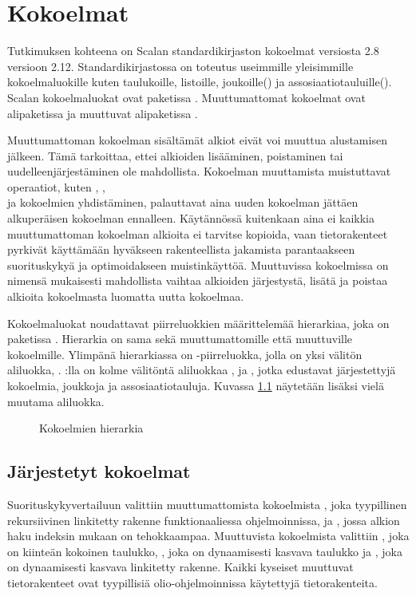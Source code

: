 \chapter{Kokoelmat} \label{Kokoelmat}
Tutkimuksen kohteena on Scalan standardikirjaston kokoelmat versiosta 2.8 versioon 2.12. Standardikirjastossa on toteutus useimmille yleisimmille kokoelmaluokille kuten taulukoille, listoille, joukoille() ja assosiaatiotauluille(). Scalan kokoelmaluokat ovat paketissa . Muuttumattomat kokoelmat ovat alipaketissa  ja muuttuvat alipaketissa .
\cite{scalaCollections}

Muuttumattoman kokoelman sisältämät alkiot eivät voi muuttua alustamisen jälkeen. Tämä tarkoittaa, ettei alkioiden lisääminen, poistaminen tai uudelleenjärjestäminen ole mahdollista. Kokoelman muuttamista muistuttavat operaatiot, kuten , , \\ ja kokoelmien yhdistäminen, palauttavat aina uuden kokoelman jättäen alkuperäisen kokoelman ennalleen. Käytännössä kuitenkaan aina ei kaikkia muuttumattoman kokoelman alkioita ei tarvitse kopioida, vaan tietorakenteet pyrkivät käyttämään hyväkseen rakenteellista jakamista parantaakseen suorituskykyä ja optimoidakseen muistinkäyttöä. Muuttuvissa kokoelmissa on nimensä mukaisesti mahdollista vaihtaa alkioiden järjestystä, lisätä ja poistaa alkioita kokoelmasta luomatta uutta kokoelmaa.
\cite{scalaCollections}
\cite[Luku 22]{prorgrammingInScala3rd}

Kokoelmaluokat noudattavat piirreluokkien määrittelemää hierarkiaa, joka on paketissa . Hierarkia on sama sekä muuttumattomille että muuttuville kokoelmille. Ylimpänä hierarkiassa on -piirreluokka, jolla on yksi välitön aliluokka, . :lla on kolme välitöntä aliluokkaa ,  ja , jotka edustavat järjestettyjä kokoelmia, joukkoja ja assosiaatiotauluja. Kuvassa \ref{kokoelmahierarkia} näytetään lisäksi vielä muutama aliluokka.
\cite{scalaCollections}
\begin{figure}[h]
    \centering
    \caption{Kokoelmien hierarkia}\label{kokoelmahierarkia}
\end{figure}


\section{Järjestetyt kokoelmat}
Suorituskykyvertailuun valittiin muuttumattomista kokoelmista , joka tyypillinen rekursiivinen linkitetty rakenne funktionaaliessa ohjelmoinnissa, ja , jossa alkion haku indeksin mukaan on tehokkaampaa. Muuttuvista kokoelmista valittiin , joka on kiinteän kokoinen taulukko, , joka on dynaamisesti kasvava taulukko ja , joka on dynaamisesti kasvava linkitetty rakenne. Kaikki kyseiset muuttuvat tietorakenteet ovat tyypillisiä olio-ohjelmoinnissa käytettyjä tietorakenteita.

